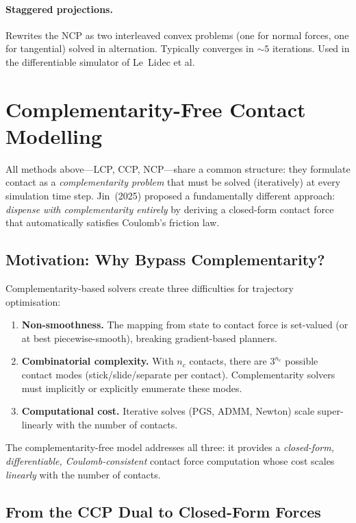 \documentclass[11pt,twoside]{report}
\theoremstyle{definition}
\theoremstyle{plain}
\theoremstyle{remark}
\newcommand{\0}{\bm{0}}
\begin{document}
\paragraph{Staggered projections.}
Rewrites the NCP as two interleaved convex problems (one for normal
forces, one for tangential) solved in alternation.  Typically converges
in ${\sim}5$ iterations.  Used in the differentiable simulator of
Le~Lidec et al.

\section{Complementarity-Free Contact Modelling}
\label{sec:comfree}

All methods above---LCP, CCP, NCP---share a common structure: they formulate
contact as a \emph{complementarity problem} that must be solved (iteratively) at every
simulation time step. Jin~(2025) proposed a fundamentally different approach:
\emph{dispense with complementarity entirely} by deriving a closed-form contact
force that automatically satisfies Coulomb's friction law.

\subsection{Motivation: Why Bypass Complementarity?}

Complementarity-based solvers create three difficulties for trajectory optimisation:
\begin{enumerate}
\item \textbf{Non-smoothness.} The mapping from state to contact force is
      set-valued (or at best piecewise-smooth), breaking gradient-based planners.
\item \textbf{Combinatorial complexity.} With $n_{c}$ contacts, there are $3^{n_{c}}$
      possible contact modes (stick/slide/separate per contact).  Complementarity
      solvers must implicitly or explicitly enumerate these modes.
\item \textbf{Computational cost.} Iterative solves (PGS, ADMM, Newton) scale
      super-linearly with the number of contacts.
\end{enumerate}

The complementarity-free model addresses all three: it provides a
\emph{closed-form, differentiable, Coulomb-consistent} contact force computation
whose cost scales \emph{linearly} with the number of contacts.

\subsection{From the CCP Dual to Closed-Form Forces}
\label{sec:comfree-derivation}
\end{document}
